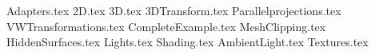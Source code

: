 \documentclass[12pt]{article} %
\begin{document}
{Adapters.tex}
{2D.tex}
\newpage
{3D.tex}
\newpage
{3DTransform.tex}
{Parallelprojections.tex}
{VWTransformations.tex}
{CompleteExample.tex}
{MeshClipping.tex}
{HiddenSurfaces.tex}  
{Lights.tex} 
{Shading.tex} 
{AmbientLight.tex} 
{Textures.tex} 
\end{document}

